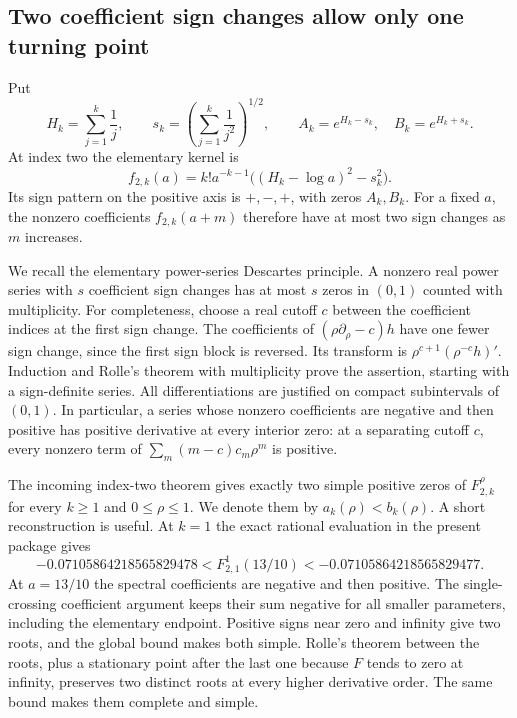 \subsection{Two coefficient sign changes allow only one turning point}

Put
\begin{equation}\label{lershape:eq:two-roots}
 H_k=\sum_{j=1}^k\frac1j,\qquad
 s_k=\left(\sum_{j=1}^k\frac1{j^2}\right)^{1/2},\qquad
 A_k=e^{H_k-s_k},\quad B_k=e^{H_k+s_k}.
\end{equation}
At index two the elementary kernel is
\begin{equation}\label{lershape:eq:f2}
 f_{2,k}(a)=k!a^{-k-1}\bigl((H_k-\log a)^2-s_k^2\bigr).
\end{equation}
Its sign pattern on the positive axis is $+,-,+$, with zeros $A_k,B_k$.
For a fixed $a$, the nonzero coefficients $f_{2,k}(a+m)$ therefore
have at most two sign changes as $m$ increases.

We recall the elementary power-series Descartes principle. A nonzero
real power series with $s$ coefficient sign changes has at most $s$
zeros in $(0,1)$ counted with multiplicity. For completeness, choose a
real cutoff $c$ between the coefficient indices at the first sign
change. The coefficients of $(\rho\partial_\rho-c)h$ have one fewer
sign change, since the first sign block is reversed. Its transform is
$\rho^{c+1}(\rho^{-c}h)'$. Induction and Rolle's theorem with
multiplicity prove the assertion, starting with a sign-definite series.
All differentiations are justified on compact subintervals of $(0,1)$.
In particular, a series whose nonzero coefficients are negative and
then positive has positive derivative at every interior zero: at a
separating cutoff $c$, every nonzero term of
$\sum_m(m-c)c_m\rho^m$ is positive.

The incoming index-two theorem gives exactly two simple positive zeros
of $F_{2,k}^{\rho}$ for every $k\geq1$ and $0\leq\rho\leq1$. We denote
them by $a_k(\rho)<b_k(\rho)$. A short reconstruction is useful. At
$k=1$ the exact rational evaluation in the present package gives
\[
 -0.07105864218565829478
 <F_{2,1}^{1}(13/10)
 <-0.07105864218565829477.
\]
At $a=13/10$ the spectral coefficients are negative and then positive.
The single-crossing coefficient argument keeps their sum negative for
all smaller parameters, including the elementary endpoint. Positive
signs near zero and infinity give two roots, and the global bound makes
both simple. Rolle's theorem between the roots, plus a stationary point
after the last one because $F$ tends to zero at infinity, preserves two
distinct roots at every higher derivative order. The same bound makes
them complete and simple.


